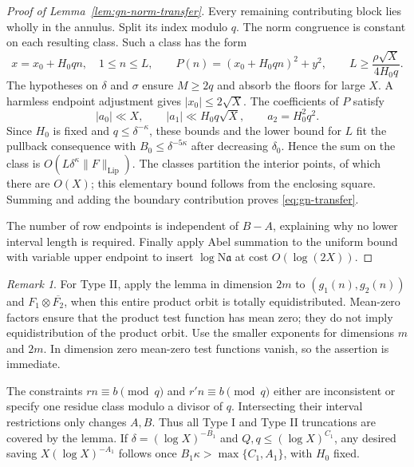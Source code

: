 \documentclass[11pt]{article}
\theoremstyle{definition}
\theoremstyle{remark}
\newtheorem{remark}[theorem]{Remark}
\begin{document}
\begin{proof}[Proof of Lemma~\ref{lem:gn-norm-transfer}]
Every remaining contributing block lies wholly in the annulus. Split
its index modulo $q$. The norm congruence is constant on each resulting
class. Such a class has the form
\[
 x=x_0+H_0qn,\quad 1\leq n\leq L,\qquad
 P(n)=(x_0+H_0qn)^2+y^2,
 \qquad L\geq\frac{\rho\sqrt X}{4H_0q}.
\]
The hypotheses on $\delta$ and $\sigma$ ensure $M\geq2q$ and absorb
the floors for large $X$. A harmless endpoint adjustment gives
$|x_0|\leq2\sqrt X$. The coefficients of $P$ satisfy
\[
 |a_0|\ll X,\qquad |a_1|\ll H_0q\sqrt X,\qquad a_2=H_0^2q^2.
\]
Since $H_0$ is fixed and $q\leq\delta^{-\kappa}$, these bounds and the
lower bound for $L$ fit the pullback consequence with
$B_0\leq\delta^{-5\kappa}$ after decreasing $\delta_0$.
Hence the sum on the class is
$O(L\delta^\kappa\|F\|_{\mathrm{Lip}})$. The classes partition the
interior points, of which there are $O(X)$; this elementary bound follows
from the enclosing square. Summing and adding the boundary contribution
proves \eqref{eq:gn-transfer}.

The number of row endpoints is independent of $B-A$, explaining why no
lower interval length is required. Finally apply Abel summation to the
uniform bound with variable upper endpoint to insert $\log\mathrm N
\mathfrak a$ at cost $O(\log(2X))$.
\end{proof}

\begin{remark}\label{rem:gn-product-and-progression}
For Type II, apply the lemma in dimension $2m$ to
$(g_1(n),g_2(n))$ and $F_1\otimes\overline{F_2}$, when this entire
product orbit is totally equidistributed. Mean-zero factors ensure that
the product test function has mean zero; they do not imply
equidistribution of the product orbit. Use the smaller exponents for
dimensions $m$ and $2m$. In dimension zero mean-zero test functions
vanish, so the assertion is immediate.

The constraints $rn\equiv b\pmod q$ and $r'n\equiv b\pmod q$ either
are inconsistent or specify one residue class modulo a divisor of $q$.
Intersecting their interval restrictions only changes $A,B$. Thus all
Type I and Type II truncations are covered by the lemma. If
$\delta=(\log X)^{-B_1}$ and $Q,q\leq(\log X)^{C_1}$, any desired
saving $X(\log X)^{-A_1}$ follows once
$B_1\kappa>\max\{C_1,A_1\}$, with $H_0$ fixed.
\end{remark}


\end{document}
